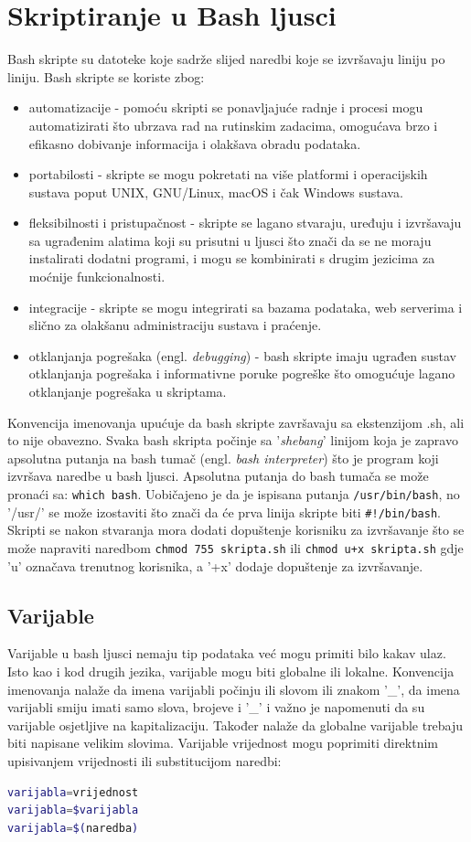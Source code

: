\documentclass{foi}
\begin{document}
\chapter{Skriptiranje u Bash ljusci}
Bash skripte su datoteke koje sadrže slijed naredbi koje se izvršavaju liniju po liniju. Bash skripte se koriste zbog\cite{freecodecamp}:
\begin{itemize}
    \item automatizacije - pomoću skripti se ponavljajuće radnje i procesi mogu automatizirati što ubrzava rad na rutinskim zadacima, omogućava brzo i efikasno dobivanje informacija i olakšava obradu podataka.
    \item portabilosti - skripte se mogu pokretati na više platformi i operacijskih sustava poput UNIX, GNU/Linux, macOS i čak Windows sustava.
    \item fleksibilnosti i pristupačnost - skripte se lagano stvaraju, uređuju i izvršavaju sa ugrađenim alatima koji su prisutni u ljusci što znači da se ne moraju instalirati dodatni programi, i mogu se kombinirati s drugim jezicima za moćnije funkcionalnosti.
    \item integracije - skripte se mogu integrirati sa bazama podataka, web serverima i slično za olakšanu administraciju sustava i praćenje.
    \item otklanjanja pogrešaka (engl. \textit{debugging}) - bash skripte imaju ugrađen sustav otklanjanja pogrešaka i informativne poruke pogreške što omogućuje lagano otklanjanje pogrešaka u skriptama.
\end{itemize}
Konvencija imenovanja upućuje da bash skripte završavaju sa ekstenzijom .sh, ali to nije obavezno. Svaka bash skripta počinje sa '\textit{shebang}' linijom koja je zapravo apsolutna putanja na bash tumač (engl. \textit{bash interpreter}) što je program koji izvršava naredbe u bash ljusci. Apsolutna putanja do bash tumača se može pronaći sa: \verb|which bash|. Uobičajeno je da je ispisana putanja \verb|/usr/bin/bash|, no '/usr/' se može izostaviti što znači da će prva linija skripte biti \verb|#!/bin/bash|. Skripti se nakon stvaranja mora dodati dopuštenje korisniku za izvršavanje što se može napraviti naredbom \verb|chmod 755 skripta.sh| ili \verb|chmod u+x skripta.sh| gdje 'u' označava trenutnog korisnika, a '+x' dodaje dopuštenje za izvršavanje.

\section{Varijable}
Varijable u bash ljusci nemaju tip podataka već mogu primiti bilo kakav ulaz. Isto kao i kod drugih jezika, varijable mogu biti globalne ili lokalne. Konvencija imenovanja nalaže da imena varijabli počinju ili slovom ili znakom '\_', da imena varijabli smiju imati samo slova, brojeve i '\_' i važno je napomenuti da su varijable osjetljive na kapitalizaciju. Također nalaže da globalne varijable trebaju biti napisane velikim slovima. Varijable vrijednost mogu poprimiti direktnim upisivanjem vrijednosti ili substitucijom naredbi:
\begin{lstlisting}[language=bash]
varijabla=vrijednost
varijabla=$varijabla
varijabla=$(naredba)
\end{lstlisting}
\end{document}
